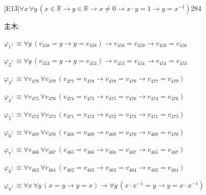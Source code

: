 \begin{fullproof}{[E13]}{$\forall x\,\forall y\,(x \in \mathbb{R} \to y \in \mathbb{R} \to x \neq 0 \to x \cdot y = 1 \to y = x^{-1})$}{284}
\begin{ptree}
\noLine
{}
\end{ptree}
\noindent 主木:
\begin{ptree}
\noLine
{}
\noLine
{}
\noLine
{}
\end{ptree}
\begin{abbrevlist}
\item $\varphi_{1} :\equiv \forall y\,(v_{458} = y \to y = v_{458}) \to v_{458} = v_{459} \to v_{459} = v_{458}$
\item $\varphi_{2} :\equiv \forall y\,(v_{453} = y \to y = v_{453}) \to v_{453} = v_{454} \to v_{454} = v_{453}$
\item $\varphi_{3} :\equiv \forall v_{478}\,\forall v_{479}\,(v_{477} = v_{478} \to v_{478} = v_{479} \to v_{477} = v_{479})$
\item $\varphi_{4} :\equiv \forall v_{475}\,\forall v_{476}\,(v_{474} = v_{475} \to v_{475} = v_{476} \to v_{474} = v_{476})$
\item $\varphi_{5} :\equiv \forall v_{472}\,\forall v_{473}\,(v_{471} = v_{472} \to v_{472} = v_{473} \to v_{471} = v_{473})$
\item $\varphi_{6} :\equiv \forall v_{469}\,\forall v_{470}\,(v_{468} = v_{469} \to v_{469} = v_{470} \to v_{468} = v_{470})$
\item $\varphi_{7} :\equiv \forall v_{466}\,\forall v_{467}\,(v_{465} = v_{466} \to v_{466} = v_{467} \to v_{465} = v_{467})$
\item $\varphi_{8} :\equiv \forall v_{463}\,\forall v_{464}\,(v_{462} = v_{463} \to v_{463} = v_{464} \to v_{462} = v_{464})$
\item $\varphi_{9} :\equiv \forall x\,\forall y\,(x = y \to y = x) \to \forall y\,(x \cdot x^{-1} = y \to y = x \cdot x^{-1})$

\end{abbrevlist}
\end{fullproof}
